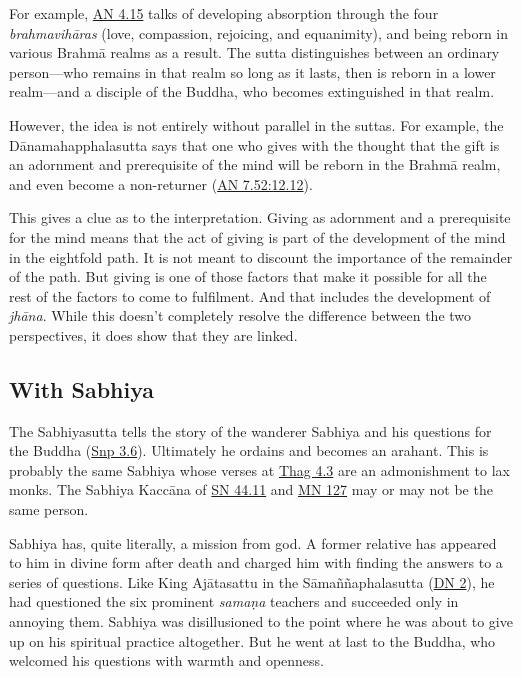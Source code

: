 \documentclass[12pt,openany]{book}%
\begin{document}
For example, \href{https://suttacentral.net/an4.15/en/sujato}{AN 4.15} talks of developing absorption through the four \textit{\textsanskrit{brahmavihāras}} (love, compassion, rejoicing, and equanimity), and being reborn in various \textsanskrit{Brahmā} realms as a result. The sutta distinguishes between an ordinary person—who remains in that realm so long as it lasts, then is reborn in a lower realm—and a disciple of the Buddha, who becomes extinguished in that realm.

However, the idea is not entirely without parallel in the suttas. For example, the \textsanskrit{Dānamahapphalasutta} says that one who gives with the thought that the gift is an adornment and prerequisite of the mind will be reborn in the \textsanskrit{Brahmā} realm, and even become a non-returner (\href{https://suttacentral.net/an7.52/en/sujato\#12.12}{AN 7.52:12.12}).

This gives a clue as to the interpretation. Giving as adornment and a prerequisite for the mind means that the act of giving is part of the development of the mind in the eightfold path. It is not meant to discount the importance of the remainder of the path. But giving is one of those factors that make it possible for all the rest of the factors to come to fulfilment. And that includes the development of \textit{\textsanskrit{jhāna}}. While this doesn’t completely resolve the difference between the two perspectives, it does show that they are linked.

\subsection*{With Sabhiya}

The Sabhiyasutta tells the story of the wanderer Sabhiya and his questions for the Buddha (\href{https://suttacentral.net/snp3.6/en/sujato}{Snp 3.6}). Ultimately he ordains and becomes an arahant. This is probably the same Sabhiya whose verses at \href{https://suttacentral.net/thag4.3/en/sujato}{Thag 4.3} are an admonishment to lax monks. The Sabhiya \textsanskrit{Kaccāna} of \href{https://suttacentral.net/sn44.11/en/sujato}{SN 44.11} and \href{https://suttacentral.net/mn127/en/sujato}{MN 127} may or may not be the same person.

Sabhiya has, quite literally, a mission from god. A former relative has appeared to him in divine form after death and charged him with finding the answers to a series of questions. Like King \textsanskrit{Ajātasattu} in the \textsanskrit{Sāmaññaphalasutta} (\href{https://suttacentral.net/dn2/en/sujato}{DN 2}), he had questioned the six prominent \textit{\textsanskrit{samaṇa}} teachers and succeeded only in annoying them. Sabhiya was disillusioned to the point where he was about to give up on his spiritual practice altogether. But he went at last to the Buddha, who welcomed his questions with warmth and openness.
\end{document}
